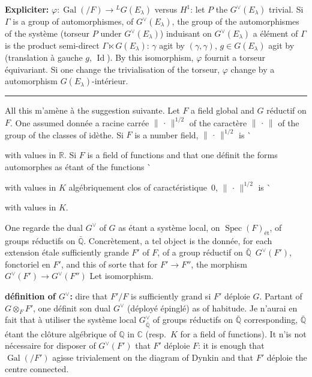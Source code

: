 \documentclass[11pt,a4paper]{article}
\theoremstyle{plain}
\theoremstyle{definition}
\DeclareMathOperator{\Spec}{Spec}
\DeclareMathOperator{\Gal}{Gal}
\DeclareMathOperator{\Id}{Id}
\newcommand{\norm}[1]{\lVert#1\rVert}
\begin{document}
{{{{{{{{{{{{\smallskip
\textbf{Expliciter:} $\varphi \colon \Gal(/F) \to {}^LG(E_\lambda)$ versus $H^1$: let $P$ the $G^\vee(E_\lambda)$ trivial. Si $\Gamma$ is a group of automorphismes, of $G^\vee(E_\lambda)$, the group of the automorphismes of the syst\`{e}me (torseur $P$ under $G^\vee(E_\lambda)$) induisant on $G^\vee(E_\lambda)$ a \'{e}l\'{e}ment of $\Gamma$ is the product semi-direct $\Gamma \ltimes G(E_\lambda)$: $\gamma$ agit by $(\gamma,\gamma)$, $g \in G(E_\lambda)$ agit by (translation \`{a} gauche $g$, $\Id$). By this isomorphism, $\varphi$ fournit a torseur \'{e}quivariant. Si one change the trivialisation of the torseur, $\varphi$ change by a automorphism $G(E_\lambda)$-int\'{e}rieur.

\begin{center}
\rule{4cm}{0.4pt}
\end{center}

All this m'am\`{e}ne \`{a} the suggestion suivante. Let $F$ a field global and $G$ r\'{e}ductif on $F$. One assumed donn\'{e}e a racine carr\'{e}e $\norm{\,\cdot\,}^{1/2}$ of the caract\`{e}re $\norm{\,\cdot\,}$ of the group of the classes of id\`{e}the. Si $F$ is a number field, $\norm{\,\cdot\,}^{1/2}$ is \`{with values in $\mathbb R$. Si $F$ is a field of functions and that one d\'{e}finit the forms automorphes as \'{e}tant of the functions \`{with values in $K$ alg\'{e}briquement clos of caract\'{e}ristique~$0$, $\norm{\,\cdot\,}^{1/2}$ is \`{with values in $K$.

One regarde the dual $G^\vee$ of $G$ as \'{e}tant a syst\`{e}me local, on $\Spec(F)_{\text{\'et}}$, of groups r\'{e}ductifs on $\bar{\mathbb Q}$. Concr\`{e}tement, a tel object is the donn\'{e}e, for each extension \'{e}tale sufficiently grande $F'$ of $F$, of a group r\'{e}ductif on $\bar{\mathbb Q}$ \,$G^\vee(F')$, fonctoriel en $F'$, and this of sorte that for $F' \to F''$, the morphism $G^\vee(F') \to G^\vee(F'')$ Let isomorphism.

\textbf{d\'{e}finition of $G^\vee$:} dire that $F'/F$ is sufficiently grand si $F'$ d\'{e}ploie $G$. Partant of $G \otimes_F F'$, one d\'{e}finit son dual $G^\vee$ (d\'{e}ploy\'{e} \'{e}pingl\'{e}) as of habitude. Je n'aurai en fait that \`{a} utiliser the syst\`{e}me local $G^\vee_{\bar{\mathbb Q}}$ of groups r\'{e}ductifs on $\bar{\mathbb Q}$ corresponding, $\bar{\mathbb Q}$ \'{e}tant the cl\^{o}ture alg\'{e}brique of $\mathbb Q$ in $\mathbb C$ (resp.~$K$ for a field of functions). It n'is not n\'{e}cessaire for disposer of $G^\vee(F')$ that $F'$ d\'{e}ploie $F$: it is enough that $\Gal(/F')$ agisse trivialement on the diagram of Dynkin and that $F'$ d\'{e}ploie the centre connected.

}}}}}}}}}}}}}}}
\end{document}
